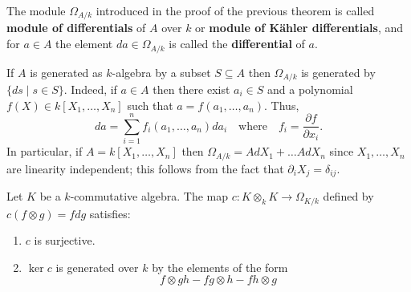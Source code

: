 \begin{definition}\label{def:module-of-differentials}
	The module $\Omega_{A/k}$ introduced in the proof of the previous theorem is called \textbf{module of differentials} of $A$ over $k$ or \textbf{module of Kähler differentials}, and for $a \in A$ the element $da\in \Omega_{A/k}$ is called the \textbf{differential} of $a$.
\end{definition}
\begin{example}\label{ex:differentials-of-polynomials}
	If $A$ is generated as $k$-algebra by a subset $S \subseteq A$ then $\Omega_{A/k}$ is generated by $\{ds\mid s \in S\}$. Indeed, if $a \in A$ then there exist $a_{i}\in S$ and a polynomial $f(X) \in k[X_{1}, \ldots, X_{n}]$ such that $a = f(a_{1}, \ldots, a_{n})$. Thus,
	\[
		da = \sum_{i=1}^{n} f_{i}(a_{1}, \ldots, a_{n})da_{i} \quad \text{where}\quad f_{i} = \frac{\partial f}{\partial x_{i}}.
	\]
	In particular, if $A = k[X_{1}, \ldots, X_{n}]$ then $\Omega_{A/k} = A dX_{1} + \ldots A dX_{n}$ since $X_{1}, \ldots, X_{n}$ are linearity independent; this follows from the fact that $\partial_{i} X_{j} = \delta_{ij}$.
\end{example}
\begin{lemma}\label{lemm:c-map-differentials}
	Let $K$ be a $k$-commutative algebra. The map $c\colon K \otimes_{k} K \to \Omega_{K/k}$ defined by $c(f \otimes g) = fdg$ satisfies:
	\begin{enumerate}[label = (\roman*)]
		\item $c$ is surjective.
		\item $\ker c$ is generated over $k$ by the elements of the form
		\[
			f \otimes gh - fg \otimes h - fh \otimes g
		\]
	\end{enumerate}
\end{lemma}
